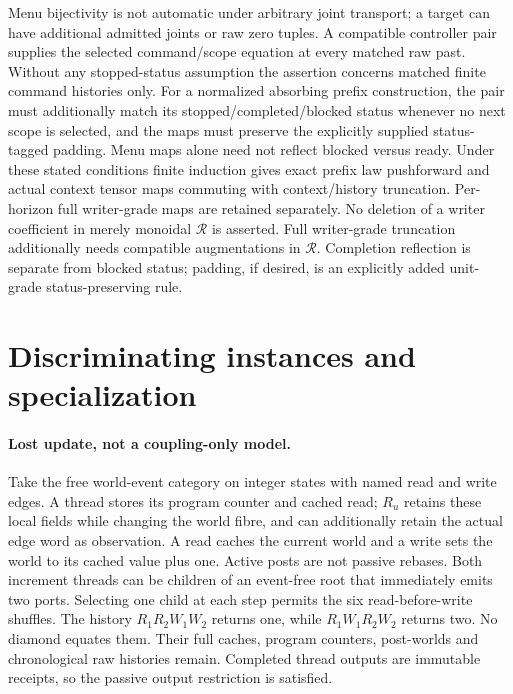 \documentclass[11pt]{article}
\begin{document}
Menu bijectivity is not automatic under arbitrary joint transport; a target can have additional admitted joints or raw zero tuples. A compatible controller pair supplies the selected command/scope equation at every matched raw past. Without any stopped-status assumption the assertion concerns matched finite command histories only. For a normalized absorbing prefix construction, the pair must additionally match its stopped/completed/blocked status whenever no next scope is selected, and the maps must preserve the explicitly supplied status-tagged padding. Menu maps alone need not reflect blocked versus ready. Under these stated conditions finite induction gives exact prefix law pushforward and actual context tensor maps commuting with context/history truncation. Per-horizon full writer-grade maps are retained separately. No deletion of a writer coefficient in merely monoidal $\mathcal R$ is asserted. Full writer-grade truncation additionally needs compatible augmentations in $\mathcal R$. Completion reflection is separate from blocked status; padding, if desired, is an explicitly added unit-grade status-preserving rule.

\section{Discriminating instances and specialization}
\paragraph{Lost update, not a coupling-only model.}
Take the free world-event category on integer states with named read and write edges. A thread stores its program counter and cached read; $R_u$ retains these local fields while changing the world fibre, and can additionally retain the actual edge word as observation. A read caches the current world and a write sets the world to its cached value plus one. Active posts are not passive rebases. Both increment threads can be children of an event-free root that immediately emits two ports. Selecting one child at each step permits the six read-before-write shuffles. The history $R_1R_2W_1W_2$ returns one, while $R_1W_1R_2W_2$ returns two. No diamond equates them. Their full caches, program counters, post-worlds and chronological raw histories remain. Completed thread outputs are immutable receipts, so the passive output restriction is satisfied.
\end{document}

